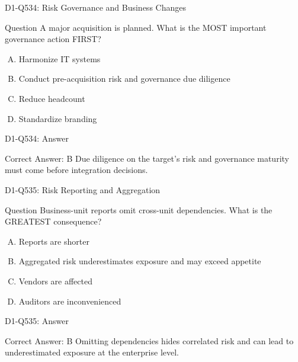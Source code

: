 \documentclass{beamer}
\begin{document}
\begin{frame}{D1-Q534: Risk Governance and Business Changes}
	\begin{block}{Question}
		A major acquisition is planned. What is the MOST important governance action FIRST?
	\end{block}
	\begin{enumerate}[(A)]
		\item Harmonize IT systems
		\item Conduct pre-acquisition risk and governance due diligence
		\item Reduce headcount
		\item Standardize branding
	\end{enumerate}
\end{frame}
\begin{frame}{D1-Q534: Answer}
	\begin{block}{Correct Answer: B}
		Due diligence on the target's risk and governance maturity must come before integration decisions.
	\end{block}
\end{frame}

\begin{frame}{D1-Q535: Risk Reporting and Aggregation}
	\begin{block}{Question}
		Business-unit reports omit cross-unit dependencies. What is the GREATEST consequence?
	\end{block}
	\begin{enumerate}[(A)]
		\item Reports are shorter
		\item Aggregated risk underestimates exposure and may exceed appetite
		\item Vendors are affected
		\item Auditors are inconvenienced
	\end{enumerate}
\end{frame}
\begin{frame}{D1-Q535: Answer}
	\begin{block}{Correct Answer: B}
		Omitting dependencies hides correlated risk and can lead to underestimated exposure at the enterprise level.
	\end{block}
\end{frame}
\end{document}
